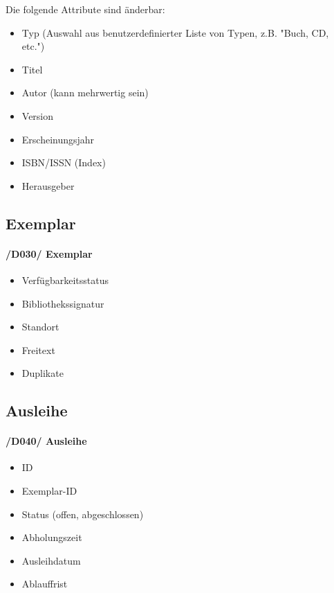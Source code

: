 \documentclass{article}
\begin{document}
	   Die folgende Attribute sind änderbar:
	   	\begin{itemize}
	   \item Typ (Auswahl aus benutzerdefinierter Liste von Typen, z.B. "Buch, CD, etc.")
	   \item Titel
	   \item Autor (kann mehrwertig  sein)
	   \item Version
	   \item Erscheinungsjahr
	   \item ISBN/ISSN (Index)
	   \item Herausgeber

	\end{itemize}

	\subsection{Exemplar}
	\label{D030} \paragraph{/D030/ Exemplar}
	\begin{itemize}
        \item Verfügbarkeitsstatus
	    \item Bibliothekssignatur
	    \item Standort
	    \item Freitext
	    \item Duplikate
	   	\end{itemize}

\subsection{Ausleihe}
	\label{D040} \paragraph{/D040/ Ausleihe}
	\begin{itemize}
	\item ID
	\item Exemplar-ID
	\item Status (offen, abgeschlossen)
	\item Abholungszeit
	\item Ausleihdatum
	\item Ablauffrist
	\end{itemize}

\end{document}
